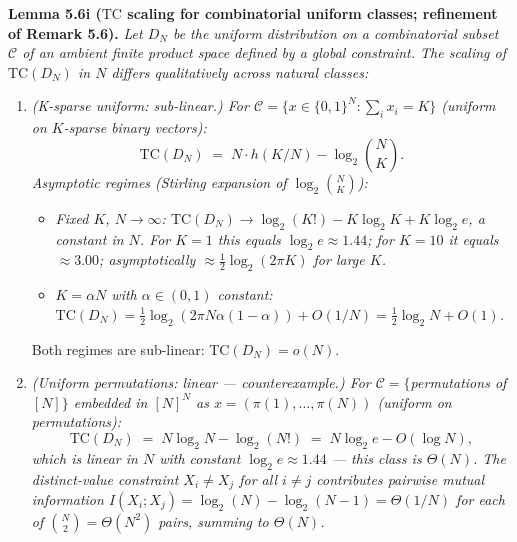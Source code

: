 \documentclass[
]{article}
\begin{document}
\textbf{Lemma 5.6i ($\mathrm{TC}$ scaling for combinatorial uniform
classes; refinement of Remark 5.6).}
\emph{Let $D_N$ be the uniform distribution on a combinatorial subset
$\mathcal{C}$ of an ambient finite product space defined by a global
constraint. The scaling of $\mathrm{TC}(D_N)$ in $N$ differs
qualitatively across natural classes:}
\begin{enumerate}
\item \emph{(K-sparse uniform: sub-linear.) For $\mathcal{C} = \{x \in
\{0,1\}^N : \sum_i x_i = K\}$ (uniform on $K$-sparse binary vectors):
\[
\mathrm{TC}(D_N) \;=\; N \cdot h(K/N) - \log_2 \binom{N}{K}.
\]
Asymptotic regimes (Stirling expansion of $\log_2 \binom{N}{K}$):}
\begin{itemize}
\item \emph{Fixed $K$, $N \to \infty$: $\mathrm{TC}(D_N) \to \log_2(K!) -
K \log_2 K + K \log_2 e$, a constant in $N$. For $K = 1$ this
equals $\log_2 e \approx 1.44$; for $K = 10$ it equals $\approx
3.00$; asymptotically $\approx \tfrac{1}{2} \log_2(2 \pi K)$ for
large $K$.}
\item \emph{$K = \alpha N$ with $\alpha \in (0, 1)$ constant:
$\mathrm{TC}(D_N) = \tfrac{1}{2} \log_2(2 \pi N \alpha (1-\alpha))
+ O(1/N) = \tfrac{1}{2} \log_2 N + O(1)$.}
\end{itemize}
Both regimes are sub-linear: $\mathrm{TC}(D_N) = o(N)$.
\item \emph{(Uniform permutations: linear --- counterexample.) For
$\mathcal{C} = \{$permutations of $[N]\}$ embedded in $[N]^N$ as
$x = (\pi(1), \ldots, \pi(N))$ (uniform on permutations):
\[
\mathrm{TC}(D_N) \;=\; N \log_2 N - \log_2(N!) \;=\; N \log_2 e - O(\log N),
\]
which is linear in $N$ with constant $\log_2 e \approx 1.44$ ---
this class is $\Theta(N)$. The distinct-value constraint $X_i \neq
X_j$ for all $i \neq j$ contributes pairwise mutual information
$I(X_i; X_j) = \log_2(N) - \log_2(N-1) = \Theta(1/N)$ for each of
$\binom{N}{2} = \Theta(N^2)$ pairs, summing to $\Theta(N)$.}
\end{enumerate}
\end{document}
